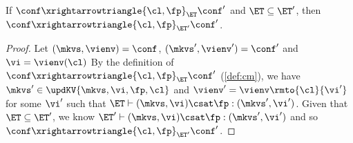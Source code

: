 \begin{lemma}
\label{lem:mono-et}
If $\conf \xrightarrowtriangle{\cl, \fp}_{\ET} \conf'$ and $\ET \subseteq \ET'$, 
then $\conf \xrightarrowtriangle{\cl, \fp}_{\ET'} \conf'$.
\end{lemma}
\begin{proof}
    Let \((\mkvs, \vienv)  = \conf \), \( (\mkvs', \vienv') = \conf' \) and \( \vi  =\vienv(\cl) \)
    By the definition of  $\conf \xrightarrowtriangle{\cl, \fp}_{\ET} \conf'$ (\cref{def:cm}), we have \(\mkvs' \in \updKV{\mkvs, \vi, \fp, \cl}\) and  \( \vienv' = \vienv\rmto{\cl}{\vi'} \) for some \( \vi' \) such that \( \ET \vdash (\mkvs, \vi) \csat \fp : (\mkvs',\vi') \).
    Given that \( \ET \subseteq \ET'\), we know \( \ET' \vdash (\mkvs, \vi) \csat \fp : (\mkvs',\vi') \) and so $\conf \xrightarrowtriangle{\cl, \fp}_{\ET'} \conf'$.
\end{proof}

